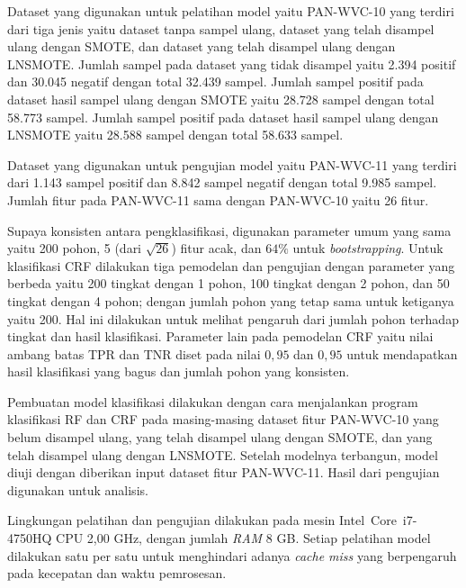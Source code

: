Dataset yang digunakan untuk pelatihan model yaitu PAN-WVC-10 yang terdiri dari
tiga jenis yaitu dataset tanpa sampel ulang, dataset yang telah disampel ulang
dengan SMOTE, dan dataset yang telah disampel ulang dengan LNSMOTE.
Jumlah sampel pada dataset yang tidak disampel yaitu 2.394 positif dan 30.045
negatif dengan total 32.439 sampel.
Jumlah sampel positif pada dataset hasil sampel ulang dengan SMOTE yaitu 28.728
sampel dengan total 58.773 sampel.
Jumlah sampel positif pada dataset hasil sampel ulang dengan LNSMOTE yaitu
28.588 sampel dengan total 58.633 sampel.

Dataset yang digunakan untuk pengujian model yaitu PAN-WVC-11 yang terdiri dari
1.143 sampel positif dan 8.842 sampel negatif dengan total 9.985 sampel.
Jumlah fitur pada PAN-WVC-11 sama dengan PAN-WVC-10 yaitu 26 fitur.

Supaya konsisten antara pengklasifikasi, digunakan parameter umum yang sama
yaitu 200 pohon, 5 (dari $\sqrt{26}$) fitur acak, dan $ 64\% $ untuk
\textit{bootstrapping}.
Untuk klasifikasi CRF dilakukan tiga pemodelan dan pengujian dengan parameter
yang berbeda yaitu 200 tingkat dengan 1 pohon, 100 tingkat dengan 2 pohon, dan
50 tingkat dengan 4 pohon; dengan jumlah pohon yang tetap sama untuk ketiganya
yaitu 200.
Hal ini dilakukan untuk melihat pengaruh dari jumlah pohon terhadap tingkat dan
hasil klasifikasi.
Parameter lain pada pemodelan CRF yaitu nilai ambang batas TPR dan TNR diset
pada nilai $0,95$ dan $0,95$ untuk mendapatkan hasil klasifikasi yang bagus dan
jumlah pohon yang konsisten.

Pembuatan model klasifikasi dilakukan dengan cara menjalankan program
klasifikasi RF dan CRF pada masing-masing dataset fitur PAN-WVC-10 yang belum
disampel ulang, yang telah disampel ulang dengan SMOTE, dan yang telah disampel
ulang dengan LNSMOTE.
Setelah modelnya terbangun, model diuji dengan diberikan input dataset fitur
PAN-WVC-11. Hasil dari pengujian digunakan untuk analisis.

Lingkungan pelatihan dan pengujian dilakukan pada mesin Intel\textregistered\
 Core\texttrademark \ i7-4750HQ CPU 2,00 GHz, dengan jumlah \textit{RAM} 8
GB. Setiap pelatihan model dilakukan satu per satu untuk menghindari adanya
\textit{cache miss} yang berpengaruh pada kecepatan dan waktu pemrosesan.
